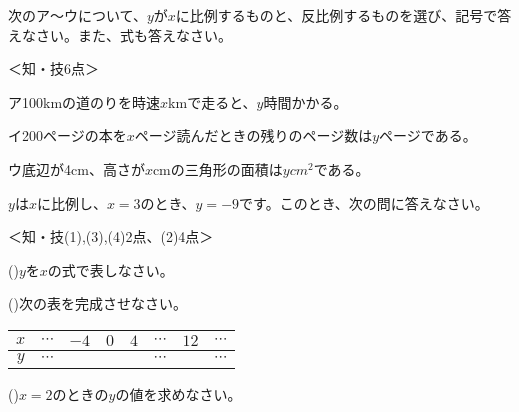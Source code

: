 \documentclass[
  12pt,a4paper,lualatex,ja=standard]{bxjsarticle}
\begin{document}
\begin{flushleft}
\begin{multicols}{2}
\end{multicols}

\vfill

\newpage

\noindent{} \hspace{1pt}次のア〜ウについて、$y$が$x$に比例するものと、反比例するものを選び、記号で答えなさい。また、式も答えなさい。

%
\begin{flushright}%
\footnotesize{＜知・技6点＞}%
\end{flushright}%


ア\hspace{1em}100kmの道のりを時速$x$kmで走ると、$y$時間かかる。

イ\hspace{1em}200ページの本を$x$ページ読んだときの残りのページ数は$y$ページである。

ウ\hspace{1em}底辺が4cm、高さが$x$cmの三角形の面積は$y$$\si{cm}^2$である。

\vfill

\noindent{} \hspace{1pt}$y$は$x$に比例し、$x = 3$のとき、$y = -9$です。このとき、次の問に答えなさい。

%
\begin{flushright}%
\footnotesize{＜知・技(1),(3),(4)2点、(2)4点＞}%
\end{flushright}%


()\hspace{2.5pt}$y$を$x$の式で表しなさい。

()\hspace{2.5pt}次の表を完成させなさい。
\begin{center}
\begin{tabular}{c|ccccccc}
\hline
$x$ & $\cdots$ & $-4$ & $0$ & $4$ & $\cdots$ & $12$ & $\cdots$ \\
\hline
$y$ & $\cdots$ &  &  &  & $\cdots$ & & $\cdots$ \\
\hline
\end{tabular}
\end{center}


()\hspace{2.5pt}$x = 2$のときの$y$の値を求めなさい。


\end{flushleft}
\end{document}
